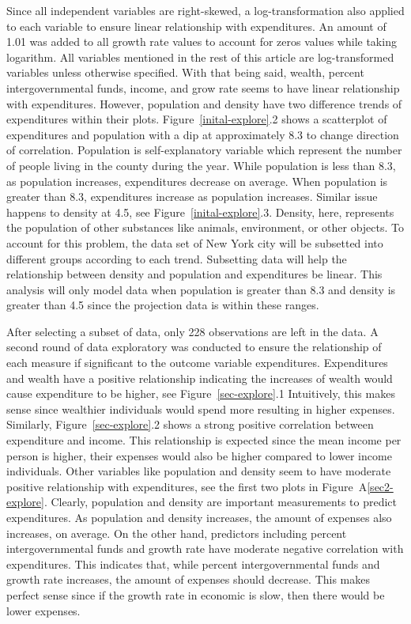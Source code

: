 \documentclass[11pt]{article}\usepackage[]{graphicx}\usepackage[]{color}
\begin{document}
\noindent Since all independent variables are right-skewed, a log-transformation also applied to each variable to ensure linear relationship with expenditures. An amount of 1.01 was added to all growth rate values to account for zeros values while taking logarithm. All variables mentioned in the rest of this article are log-transformed variables unless otherwise specified. With that being said, wealth, percent intergovernmental funds, income, and grow rate seems to have linear relationship with expenditures. However, population and density have two difference trends of expenditures within their plots. Figure~\ref{inital-explore}.2 shows a scatterplot of expenditures and population with a dip at approximately 8.3 to change direction of correlation. Population is self-explanatory variable which represent the number of people living in the county during the year. While population is less than 8.3, as population increases, expenditures decrease on average. When population is greater than 8.3, expenditures increase as population increases. Similar issue happens to density at 4.5, see Figure~\ref{inital-explore}.3. Density, here, represents the population of other substances like animals, environment, or other objects. To account for this problem, the data set of New York city will be subsetted into different groups according to each trend. Subsetting data will help the relationship between density and population and expenditures be linear. This analysis will only model data when population is greater than 8.3 and density is greater than 4.5 since the projection data is within these ranges.    
\hfill \break



\noindent After selecting a subset of data, only 228 observations are left in the data. A second round of data exploratory was conducted to ensure the relationship of each measure if significant to the outcome variable expenditures. Expenditures and wealth have a positive relationship indicating the increases of wealth would cause expenditure to be higher, see Figure~\ref{sec-explore}.1 Intuitively, this makes sense since wealthier individuals would spend more resulting in higher expenses. Similarly, Figure~\ref{sec-explore}.2 shows a strong positive correlation between expenditure and income. This relationship is expected since the mean income per person is higher, their expenses would also be higher compared to lower income individuals. Other variables like population and density seem to have moderate positive relationship with expenditures, see the first two plots in Figure~A\ref{sec2-explore}. Clearly, population and density are important measurements to predict expenditures. As population and density increases, the amount of expenses also increases, on average. On the other hand, predictors including percent intergovernmental funds and growth rate have moderate negative correlation with expenditures. This indicates that, while percent intergovernmental funds and growth rate increases, the amount of expenses should decrease. This makes perfect sense since if the growth rate in economic is slow, then there would be lower expenses.             
\end{document}

